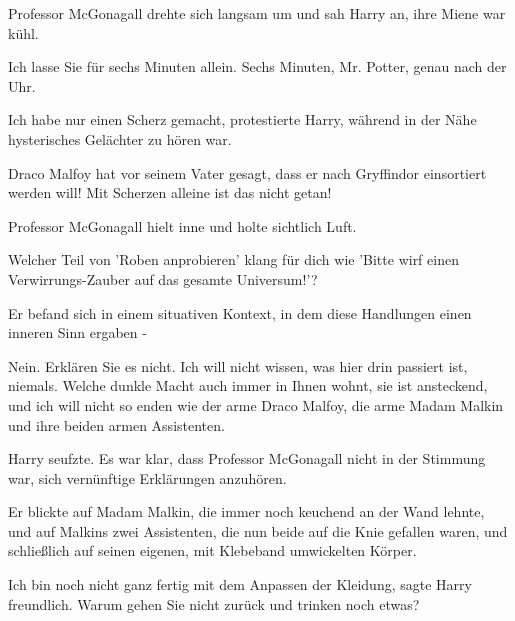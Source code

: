 Professor McGonagall drehte sich langsam um und sah Harry an, ihre Miene war
kühl.

\glqq{}Ich lasse Sie für sechs Minuten allein. Sechs Minuten, Mr. Potter, genau
nach der Uhr.\grqq{}

\glqq{}Ich habe nur einen Scherz gemacht\grqq{}, protestierte Harry, während in
der Nähe hysterisches Gelächter zu hören war.

\glqq{}Draco Malfoy hat vor seinem Vater gesagt, dass er nach Gryffindor
einsortiert werden will! Mit Scherzen alleine ist das nicht getan!\grqq{}

Professor McGonagall hielt inne und holte sichtlich Luft.

\glqq{}Welcher Teil von 'Roben anprobieren' klang für dich wie 'Bitte wirf einen
Verwirrungs-Zauber auf das gesamte Universum!'?\grqq{}

\glqq{}Er befand sich in einem situativen Kontext, in dem diese Handlungen einen
inneren Sinn ergaben -\grqq{}

\glqq{}Nein. Erklären Sie es nicht. Ich will nicht wissen, was hier drin passiert
ist, niemals. Welche dunkle Macht auch immer in Ihnen wohnt, sie ist ansteckend,
und ich will nicht so enden wie der arme Draco Malfoy, die arme Madam Malkin und
ihre beiden armen Assistenten.\grqq{}

Harry seufzte. Es war klar, dass Professor McGonagall nicht in der Stimmung war,
sich vernünftige Erklärungen anzuhören.

Er blickte auf Madam Malkin, die immer noch keuchend an der Wand lehnte, und auf
Malkins zwei Assistenten, die nun beide auf die Knie gefallen waren, und
schließlich auf seinen eigenen, mit Klebeband umwickelten Körper.

\glqq{}Ich bin noch nicht ganz fertig mit dem Anpassen der Kleidung\grqq{}, sagte
Harry freundlich. \glqq{}Warum gehen Sie nicht zurück und trinken noch
etwas?\grqq{}